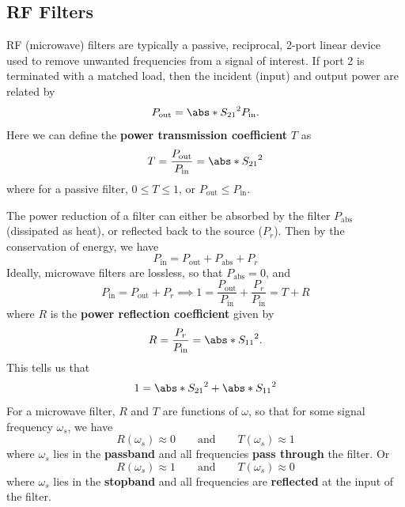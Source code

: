 \documentclass{article}
\begin{document}
\subsection{RF Filters}
RF (microwave) filters are typically a passive, reciprocal, 2-port
linear device used to remove unwanted frequencies from a signal of
interest. If port 2 is terminated with a matched load, then the
incident (input) and output power are related by
\begin{equation*}
    P_{\mathrm{out}} = \abs*{S_{21}}^2 P_{\mathrm{in}}.
\end{equation*}
Here we can define the \textbf{power transmission coefficient} \(T\) as
\begin{equation*}
    T = \frac{P_{\mathrm{out}}}{P_{\mathrm{in}}} = \abs*{S_{21}}^2
\end{equation*}
where for a passive filter, \(0 \leqslant T \leqslant 1\), or
\(P_{\mathrm{out}} \leqslant P_{\mathrm{in}}\).

The power reduction of a filter can either be absorbed by the filter
\(P_{\mathrm{abs}}\) (dissipated as heat), or reflected back to the
source (\(P_r\)). Then by the conservation of energy, we have
\begin{equation*}
    P_{\mathrm{in}} = P_{\mathrm{out}} + P_{\mathrm{abs}} + P_r
\end{equation*}
Ideally, microwave filters are lossless, so that \(P_{\mathrm{abs}} = 0\),
and
\begin{equation*}
    P_{\mathrm{in}} = P_{\mathrm{out}} + P_r \implies 1 = \frac{P_\mathrm{out}}{P_{\mathrm{in}}} + \frac{P_r}{P_{\mathrm{in}}} = T + R
\end{equation*}
where \(R\) is the \textbf{power reflection coefficient} given by
\begin{equation*}
    R = \frac{P_r}{P_{\mathrm{in}}} = \abs*{S_{11}}^2.
\end{equation*}
This tells us that
\begin{equation*}
    1 = \abs*{S_{21}}^2 + \abs*{S_{11}}^2
\end{equation*}
For a microwave filter, \(R\) and \(T\) are functions of \(\omega\), so
that for some signal frequency \(\omega_s\), we have
\begin{equation*}
    R\left( \omega_s \right) \approx 0 \qquad \text{and} \qquad T\left( \omega_s \right) \approx 1
\end{equation*}
where \(\omega_s\) lies in the \textbf{passband} and all frequencies
\textbf{pass through} the filter. Or
\begin{equation*}
    R\left( \omega_s \right) \approx 1 \qquad \text{and} \qquad T\left( \omega_s \right) \approx 0
\end{equation*}
where \(\omega_s\) lies in the \textbf{stopband} and all frequencies
are \textbf{reflected} at the input of the filter.
\end{document}
